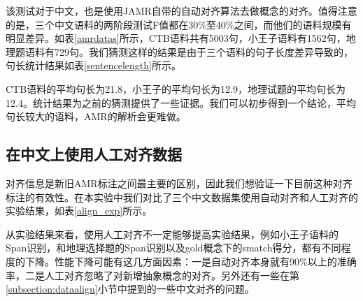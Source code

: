 \documentclass[master, winfont]{njuthesis}
\begin{document}
该测试对于中文，也是使用JAMR自带的自动对齐算法去做概念的对齐。值得注意的是，三个中文语料的两阶段测试F值都在30\%至40\%之间，而他们的语料规模有明显差异。如表\ref{amrdatas}所示，CTB语料共有5003句，小王子语料有1562句，地理题语料有729句。我们猜测这样的结果是由于三个语料的句子长度差异导致的，句长统计结果如表\ref{sentencelength}所示。

CTB语料的平均句长为21.8，小王子的平均句长为12.9，地理试题的平均句长为12.4。统计结果为之前的猜测提供了一些证据。我们可以初步得到一个结论，平均句长较大的语料，AMR的解析会更难做。

\subsection{在中文上使用人工对齐数据}
对齐信息是新旧AMR标注之间最主要的区别，因此我们想验证一下目前这种对齐标注的有效性。在本实验中我们对比了三个中文数据集使用自动对齐和人工对齐的实验结果，如表\ref{align_exp}所示。

从实验结果来看，使用人工对齐不一定能够提高实验结果，例如小王子语料的Span识别，和地理选择题的Span识别以及gold概念下的smatch得分，都有不同程度的下降。性能下降可能有这几方面因素：一是自动对齐本身就有90\%以上的准确率，二是人工对齐忽略了对新增抽象概念的对齐。另外还有一些在第\ref{subsection:dataalign}小节中提到的一些中文对齐的问题。

\begin{center}
\begin{table}[!htbp]
\caption{\label{align_exp} 中文AMR人工对齐数据的影响}
\end{table}
\end{center}
\end{document}
